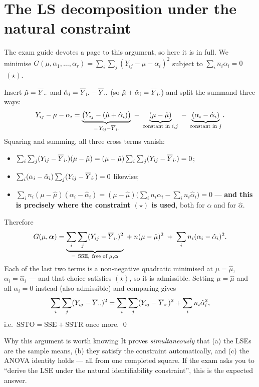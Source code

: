 \documentclass[11pt]{article}
\begin{document}
\section{The LS decomposition under the natural constraint}

The exam guide devotes a page to this argument, so here it is in full. We minimise
$G(\mu,\alpha_1,\dots,\alpha_r)=\sum_i\sum_j(Y_{ij}-\mu-\alpha_i)^2$ subject to
$\sum_i n_i\alpha_i=0$ $\ (\star)$.

Insert $\hat\mu=\overline{Y}_{\cdot\cdot}$ and $\hat\alpha_i=\overline{Y}_{i\cdot}-\overline{Y}_{\cdot\cdot}$
(so $\hat\mu+\hat\alpha_i=\overline{Y}_{i\cdot}$) and split the summand three ways:
\[
  Y_{ij}-\mu-\alpha_i=\underbrace{\big(Y_{ij}-(\hat\mu+\hat\alpha_i)\big)}_{=\,Y_{ij}-\overline{Y}_{i\cdot}}
  \;-\;\underbrace{(\mu-\hat\mu)}_{\text{constant in }i,j}
  \;-\;\underbrace{(\alpha_i-\hat\alpha_i)}_{\text{constant in }j} .
\]
Squaring and summing, all three cross terms vanish:
\begin{itemize}
  \item $\sum_i\sum_j(Y_{ij}-\overline{Y}_{i\cdot})(\mu-\hat\mu)=(\mu-\hat\mu)\sum_i\sum_j(Y_{ij}-\overline{Y}_{i\cdot})=0$;
  \item $\sum_i(\alpha_i-\hat\alpha_i)\sum_j(Y_{ij}-\overline{Y}_{i\cdot})=0$ likewise;
  \item $\sum_i n_i(\mu-\hat\mu)(\alpha_i-\hat\alpha_i)=(\mu-\hat\mu)\big(\sum_i n_i\alpha_i-\sum_i n_i\hat\alpha_i\big)=0$
        --- \textbf{and this is precisely where the constraint $(\star)$ is used}, both for
        $\alpha$ and for $\hat\alpha$.
\end{itemize}
Therefore
\[
  G(\mu,\bal)=\underbrace{\sum_i\sum_j(Y_{ij}-\Ybar_{i\cdot})^2}_{=\ \mathrm{SSE},\ \text{free of }\mu,\bal}
  \;+\;n(\mu-\hat\mu)^2\;+\;\sum_i n_i(\alpha_i-\hat\alpha_i)^2 .
\]
Each of the last two terms is a non-negative quadratic minimised at $\mu=\hat\mu$,
$\alpha_i=\hat\alpha_i$ --- and that choice satisfies $(\star)$, so it is admissible.
Setting $\mu=\hat\mu$ and all $\alpha_i=0$ instead (also admissible) and comparing gives
\[
  \sum_i\sum_j(Y_{ij}-\overline{Y}_{\cdot\cdot})^2=\sum_i\sum_j(Y_{ij}-\overline{Y}_{i\cdot})^2+\sum_i n_i\hat\alpha_i^2,
\]
i.e.\ $\mathrm{SSTO}=\mathrm{SSE}+\mathrm{SSTR}$ once more. \qed

\begin{idea}{Why this argument is worth knowing}
It proves \emph{simultaneously} that (a) the LSEs are the sample means, (b) they satisfy the
constraint automatically, and (c) the ANOVA identity holds --- all from one completed square.
If the exam asks you to ``derive the LSE under the natural identifiability constraint'', this
is the expected answer.
\end{idea}
\end{document}
